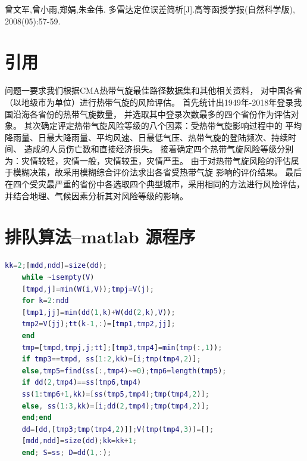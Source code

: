 \documentclass{cumcmthesis}
\begin{document}
\begin{thebibliography}{9}%
曾文军,曾小雨,郑娟,朱金伟.
    多雷达定位误差简析[J].高等函授学报(自然科学版),
    2008(05):57-59.

\end{thebibliography}


\newpage
\begin{appendices}
\section{引用}
  问题一要求我们根据CMA热带气旋最佳路径数据集和其他相关资料，
对中国各省（以地级市为单位）进行热带气旋的风险评估。
首先统计出1949年-2018年登录我国沿海各省份的热带气旋数量，
并选取其中登录次数最多的四个省份作为评估对象。
其次确定评定热带气旋风险等级的八个因素：受热带气旋影响过程中的
平均降雨量、日最大降雨量、平均风速、日最低气压、热带气旋的登陆频次、持续时间、
造成的人员伤亡数和直接经济损失。
接着确定四个热带气旋风险等级分别为：灾情较轻，灾情一般，灾情较重，灾情严重。
由于对热带气旋风险的评估属于模糊决策，故采用模糊综合评价法求出各省受热带气旋
影响的评价结果。\cite{bib:one}
最后在四个受灾最严重的省份中各选取四个典型城市，采用相同的方法进行风险评估，
并结合地理、气候因素分析其对风险等级的影响。

\section{排队算法--matlab 源程序}
    \begin{lstlisting}[language=matlab]
    kk=2;[mdd,ndd]=size(dd);
    while ~isempty(V)
    [tmpd,j]=min(W(i,V));tmpj=V(j);
    for k=2:ndd
    [tmp1,jj]=min(dd(1,k)+W(dd(2,k),V));
    tmp2=V(jj);tt(k-1,:)=[tmp1,tmp2,jj];
    end
    tmp=[tmpd,tmpj,j;tt];[tmp3,tmp4]=min(tmp(:,1));
    if tmp3==tmpd, ss(1:2,kk)=[i;tmp(tmp4,2)];
    else,tmp5=find(ss(:,tmp4)~=0);tmp6=length(tmp5);
    if dd(2,tmp4)==ss(tmp6,tmp4)
    ss(1:tmp6+1,kk)=[ss(tmp5,tmp4);tmp(tmp4,2)];
    else, ss(1:3,kk)=[i;dd(2,tmp4);tmp(tmp4,2)];
    end;end
    dd=[dd,[tmp3;tmp(tmp4,2)]];V(tmp(tmp4,3))=[];
    [mdd,ndd]=size(dd);kk=kk+1;
    end; S=ss; D=dd(1,:);
    \end{lstlisting}


\end{appendices}
\end{document}

